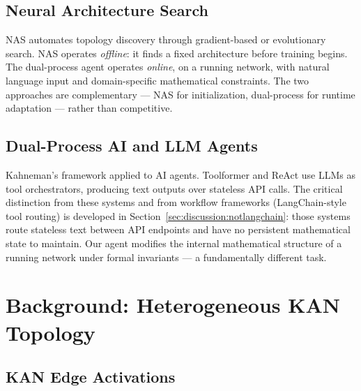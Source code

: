 \documentclass[11pt,a4paper]{article}
\begin{document}
\subsection{Neural Architecture Search}

NAS \citep{elsken2019neural} automates topology discovery through gradient-based
\citep{liu2019darts} or evolutionary search. NAS operates \emph{offline}: it finds
a fixed architecture before training begins. The dual-process agent operates
\emph{online}, on a running network, with natural language input and domain-specific
mathematical constraints. The two approaches are complementary --- NAS for
initialization, dual-process for runtime adaptation --- rather than competitive.

\subsection{Dual-Process AI and LLM Agents}

Kahneman's framework \citep{kahneman2011thinking} applied to AI agents. Toolformer
\citep{schick_etal_2023_toolformer} and ReAct \citep{yao_etal_2023_react} use LLMs
as tool orchestrators, producing text outputs over stateless API calls. The critical
distinction from these systems and from workflow frameworks (LangChain-style tool
routing) is developed in Section~\ref{sec:discussion:notlangchain}: those systems
route stateless text between API endpoints and have no persistent mathematical state
to maintain. Our agent modifies the internal mathematical structure of a running
network under formal invariants --- a fundamentally different task.

\section{Background: Heterogeneous KAN Topology}
\label{sec:background}

\subsection{KAN Edge Activations}
\label{sec:background:edges}
\end{document}
